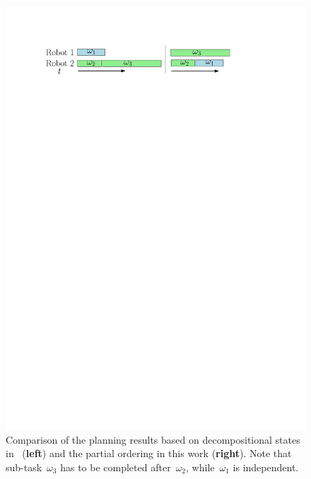 \begin{figure}[t!]
	\centering
	\includegraphics[width=0.95\linewidth]{figures/concurrent.pdf}
	\caption{Comparison of the planning results based on decompositional states
		in~\citep{schillinger2018simultaneous} (\textbf{left}) and the partial ordering in this work (\textbf{right}).
		Note that sub-task~$\omega_3$ has to be {completed}
                after~$\omega_2$, while~$\omega_1$ is independent.}
		\label{fig:concurrent}
\end{figure}



